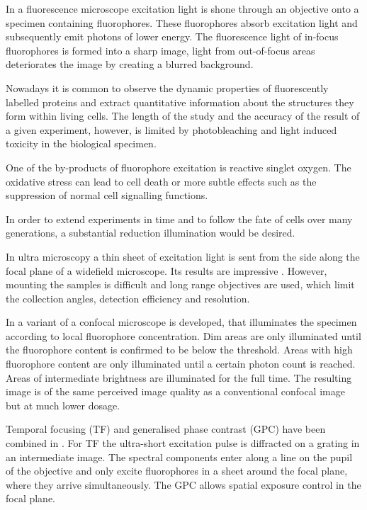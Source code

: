 \documentclass[a4paper, 11pt]{article}
\begin{document}
\begin{multicols}{2}


In a fluorescence microscope excitation light is shone through an
objective onto a specimen containing fluorophores. These fluorophores
absorb excitation light and subsequently emit photons of lower
energy. The fluorescence light of in-focus fluorophores is formed into
a sharp image, light from out-of-focus areas deteriorates the image by
creating a blurred background.

 
Nowadays it is common to observe the dynamic properties of
fluorescently labelled proteins and extract quantitative information
about the structures they form within living cells. The length of the
study and the accuracy of the result of a given experiment, however,
is limited by photobleaching and light induced toxicity in the
biological specimen.

One of the by-products of fluorophore excitation is reactive singlet
oxygen. The oxidative stress can lead to cell death or more subtle
effects such as the suppression of normal cell signalling functions.

In order to extend experiments in time and to follow the fate of cells
over many generations, a substantial reduction illumination would be
desired.

In ultra microscopy a thin sheet of excitation light is sent from the
side along the focal plane of a widefield microscope. Its results are
impressive \cite{Huisken2004}. However, mounting the samples is
difficult and long range objectives are used, which limit the
collection angles, detection efficiency and resolution.

In \cite{Hoebe2007} a variant of a confocal microscope is developed,
that illuminates the specimen according to local fluorophore
concentration. Dim areas are only illuminated until the fluorophore
content is confirmed to be below the threshold. Areas with high
fluorophore content are only illuminated until a certain photon count
is reached. Areas of intermediate brightness are illuminated for the
full time. The resulting image is of the same perceived image quality
as a conventional confocal image but at much lower dosage.

Temporal focusing (TF) and generalised phase contrast (GPC) have been
combined in \cite{Papagiakoumou2010}. For TF the ultra-short
excitation pulse is diffracted on a grating in an intermediate
image. The spectral components enter along a line on the pupil of the
objective and only excite fluorophores in a sheet around the focal
plane, where they arrive simultaneously. The GPC allows spatial
exposure control in the focal plane.


\end{multicols}
\end{document}
